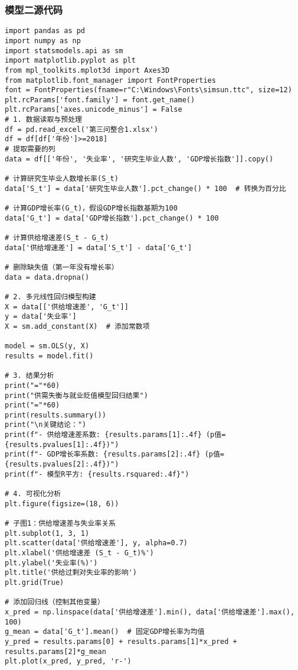 \documentclass[withoutpreface,bwprint]{cumcmthesis} %
\begin{document}
\subsubsection{模型二源代码}

\begin{verbatim}
import pandas as pd
import numpy as np
import statsmodels.api as sm
import matplotlib.pyplot as plt
from mpl_toolkits.mplot3d import Axes3D
from matplotlib.font_manager import FontProperties
font = FontProperties(fname=r"C:\Windows\Fonts\simsun.ttc", size=12)
plt.rcParams['font.family'] = font.get_name()
plt.rcParams['axes.unicode_minus'] = False
# 1. 数据读取与预处理
df = pd.read_excel('第三问整合1.xlsx')
df = df[df['年份']>=2018]
# 提取需要的列
data = df[['年份', '失业率', '研究生毕业人数', 'GDP增长指数']].copy()

# 计算研究生毕业人数增长率(S_t)
data['S_t'] = data['研究生毕业人数'].pct_change() * 100  # 转换为百分比

# 计算GDP增长率(G_t)，假设GDP增长指数基期为100
data['G_t'] = data['GDP增长指数'].pct_change() * 100

# 计算供给增速差(S_t - G_t)
data['供给增速差'] = data['S_t'] - data['G_t']

# 删除缺失值（第一年没有增长率）
data = data.dropna()

# 2. 多元线性回归模型构建
X = data[['供给增速差', 'G_t']]
y = data['失业率']
X = sm.add_constant(X)  # 添加常数项

model = sm.OLS(y, X)
results = model.fit()

# 3. 结果分析
print("="*60)
print("供需失衡与就业贬值模型回归结果")
print("="*60)
print(results.summary())
print("\n关键结论：")
print(f"- 供给增速差系数: {results.params[1]:.4f} (p值={results.pvalues[1]:.4f})")
print(f"- GDP增长率系数: {results.params[2]:.4f} (p值={results.pvalues[2]:.4f})")
print(f"- 模型R平方: {results.rsquared:.4f}")

# 4. 可视化分析
plt.figure(figsize=(18, 6))

# 子图1：供给增速差与失业率关系
plt.subplot(1, 3, 1)
plt.scatter(data['供给增速差'], y, alpha=0.7)
plt.xlabel('供给增速差 (S_t - G_t)%')
plt.ylabel('失业率(%)')
plt.title('供给过剩对失业率的影响')
plt.grid(True)

# 添加回归线（控制其他变量）
x_pred = np.linspace(data['供给增速差'].min(), data['供给增速差'].max(), 100)
g_mean = data['G_t'].mean()  # 固定GDP增长率为均值
y_pred = results.params[0] + results.params[1]*x_pred + results.params[2]*g_mean
plt.plot(x_pred, y_pred, 'r-')


\end{verbatim}
\end{document}
